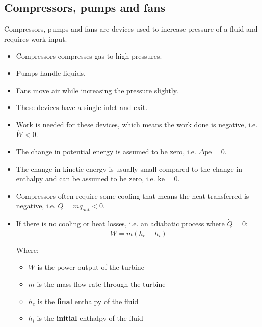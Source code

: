 \documentclass[11pt]{article}
\begin{document}
\subsection{Compressors, pumps and fans}
\label{sec:org7a9f92c}
Compressors, pumps and fans are devices used to increase pressure of a fluid and requires work input.
\begin{itemize}
\item Compressors compresses gas to high pressures.
\item Pumps handle liquids.
\item Fans move air while increasing the pressure slightly.
\item These devices have a single inlet and exit.
\item Work is needed for these devices, which means the work done is negative, i.e. \(\dot{W} < 0\).
\item The change in potential energy is assumed to be zero, i.e. \(\Delta \text{pe} = 0\).
\item The change in kinetic energy is usually small compared to the change in enthalpy and can be assumed to be zero, i.e. \(\text{ke} = 0\).
\item Compressors often require some cooling that means the heat transferred is negative, i.e. \(\dot{Q} = \dot{m} q_{out} < 0\).
\item If there is no cooling or heat losses, i.e. an adiabatic process where \(\dot{Q} = 0\):
\[\dot{W} = \dot{m} \left(h_e - h_i \right)\]

Where:
\begin{itemize}
\item \(\dot{W}\) is the power output of the turbine
\item \(\dot{m}\) is the mass flow rate through the turbine
\item \(h_e\) is the \textbf{final} enthalpy of the fluid
\item \(h_i\) is the \textbf{initial} enthalpy of the fluid
\end{itemize}
\end{itemize}

\newpage
\end{document}
